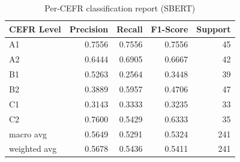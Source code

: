 \begin{table}[htbp]
\centering
\caption{Per-CEFR classification report (SBERT)}
\label{tab:classification_report_sbert}
\begin{tabular}{lrrrr}
\toprule
CEFR Level & Precision & Recall & F1-Score & Support \\
\midrule
A1 & 0.7556 & 0.7556 & 0.7556 & 45 \\
A2 & 0.6444 & 0.6905 & 0.6667 & 42 \\
B1 & 0.5263 & 0.2564 & 0.3448 & 39 \\
B2 & 0.3889 & 0.5957 & 0.4706 & 47 \\
C1 & 0.3143 & 0.3333 & 0.3235 & 33 \\
C2 & 0.7600 & 0.5429 & 0.6333 & 35 \\
macro avg & 0.5649 & 0.5291 & 0.5324 & 241 \\
weighted avg & 0.5678 & 0.5436 & 0.5411 & 241 \\
\bottomrule
\end{tabular}
\end{table}
